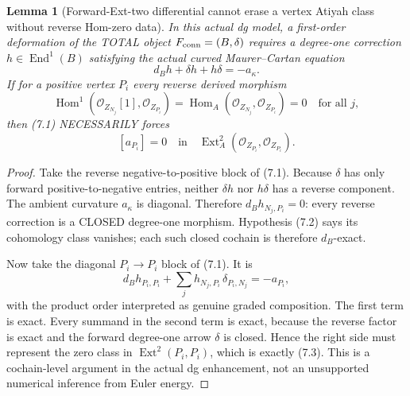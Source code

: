 \documentclass[11pt,a4paper]{article}
\newtheorem{lemma}[theorem]{Lemma}
\begin{document}
\begin{lemma}[Forward-Ext-two differential cannot erase a vertex Atiyah class without reverse Hom-zero data]
In this actual dg model,
a first-order deformation
of the TOTAL object
\(F_{\rm conn}=(B,\delta)\)
requires a degree-one
correction \(h\in\operatorname{End}^1(B)\)
satisfying the actual
curved Maurer--Cartan equation
\[
 \boxed{
   d_Bh+\delta h+h\delta=-a_\kappa .
 }                                                       \tag{7.1}
\]
If for a positive vertex \(P_i\)
every reverse derived morphism
\[
 \boxed{
 \operatorname{Hom}^{1}
    (\mathcal O_{Z_{N_j}}[1],
           \mathcal O_{Z_{P_i}})
 =\operatorname{Hom}_A
    (\mathcal O_{Z_{N_j}},
           \mathcal O_{Z_{P_i}})
 =0 \quad\text{for all }j,
 }                                                       \tag{7.2}
\]
then (7.1) NECESSARILY
forces
\[
 \boxed{[a_{P_i}]=0
 \quad\text{in}\quad
 \operatorname{Ext}^2_A
   (\mathcal O_{Z_{P_i}},
    \mathcal O_{Z_{P_i}}).}                         \tag{7.3}
\]
\end{lemma}
\begin{proof}
Take the reverse
negative-to-positive block
of (7.1). Because \(\delta\)
has only forward
positive-to-negative entries,
neither \(\delta h\) nor
\(h\delta\) has a reverse
component. The ambient
curvature \(a_\kappa\)
is diagonal. Therefore
\(d_Bh_{N_j,P_i}=0\):
every reverse correction
is a CLOSED degree-one
morphism. Hypothesis (7.2)
says its cohomology class
vanishes; each such closed
cochain is therefore
\(d_B\)-exact.

Now take the diagonal
\(P_i\to P_i\) block
of (7.1). It is
\[
  d_B h_{P_i,P_i}
       +\sum_j h_{N_j,P_i}\,
                    \delta_{P_i,N_j}
             =-a_{P_i} ,
\]
with the product order
interpreted as genuine
graded composition.
The first term is exact.
Every summand in the
second term is exact,
because the reverse
factor is exact and
the forward degree-one
arrow \(\delta\) is closed.
Hence the right side
must represent the zero
class in \(\operatorname{Ext}^2(P_i,P_i)\),
which is exactly (7.3).
This is a cochain-level
argument in the actual
dg enhancement, not an
unsupported numerical
inference from Euler energy.
\end{proof}
\end{document}
